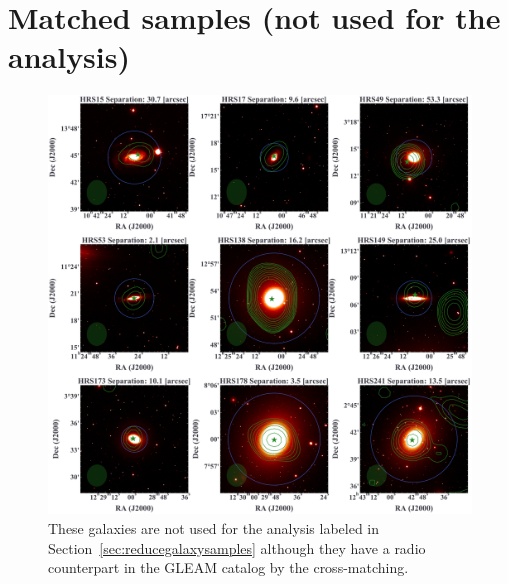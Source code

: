 \documentclass[11pt,a4paper,twoside,openright,final,titlepage]{report}
\begin{document}
\section{Matched samples (not used for the analysis)}
\begin{figure}[htbp]
    \centering
    \includegraphics[width=\linewidth]{Figures/AppendixB_galaxyimages_notselected.pdf}
    \caption[Galaxy images (9/15 not used for the analysis)]{\label{fig:galaxyimages_notselected}
        These galaxies are not used for the analysis labeled in Section~\ref{sec:reducegalaxysamples} although they have a radio counterpart in the GLEAM catalog by the cross-matching.
    }
\end{figure}
\end{document}
